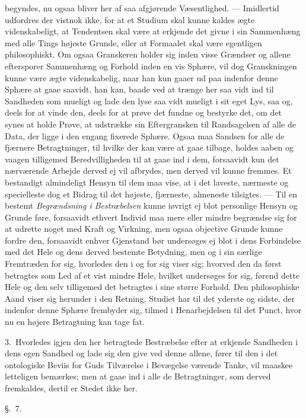 \documentclass[12pt,a4paper]{book}
\newcommand{\apage}[1]{\marginnote{\footnotesize\textit{[#1]}}}
\begin{document}
begyndes, nu ogsaa bliver her af saa afgjørende Væsentlighed. --- Imidlertid
udfordres der vistnok ikke, for at et Studium skal kunne kaldes ægte
videnskabeligt, at Tendentsen skal være at erkjende det givne i sin Sammenhæng
med alle Tings højeste Grunde, eller at Formaalet skal være egentligen
philosophiskt. Om ogsaa Granskeren holder sig inden visse Grændser og allene
eftersporer Sammenhæng og Forhold inden en vis Sphære, vil dog Granskningen
kunne være ægte videnskabelig, naar han kun gaaer ud paa indenfor denne Sphære
at gaae saavidt, han kan, baade ved at trænge \apage{54}  her saa vidt ind til Sandheden som
mueligt og lade den lyse saa vidt mueligt i sit eget Lys, saa og, deels for at
vinde den, deels for at prøve det fundne og bestyrke det, om det synes at holde
Prøve, at udstrække sin Eftergransken til Randsagelsen af alle de Data, der ligge
i den engang fixerede Sphære. Ogsaa maa Sandsen for alle de fjærnere
Betragtninger, til hvilke der kan være at gaae tilbage, holdes aaben og vaagen
tilligemed Beredvilligheden til at gaae ind i dem, forsaavidt kun det nærværende
Arbejde derved ej vil afbrydes, men derved vil kunne fremmes. Et bestandigt
almindeligt Hensyn til dem maa vise, at i det laveste, nærmeste og specielleste
dog et Bidrag til det højeste, fjærneste, almeneste tilsigtes. --- Til en bestemt
\emph{Begrændsning i Bestræbelsen} kunne iøvrigt ej blot personlige Hensyn og
Grunde føre, forsaavidt ethvert Individ maa mere eller mindre begrændse sig for
at udrette noget med Kraft og Virkning, men ogsaa objective Grunde kunne fordre
den, forsaavidt enhver Gjenstand bør undersøges ej blot i dens Forbindelse med
det Hele og dens derved bestemte Betydning, men og i sin særlige Fremtræden for
sig, hvorledes den i og for sig viser sig; hvorved den da først betragtes som Led
af et vist mindre Hele, hvilket undersøges for sig, førend dette Hele og den selv
tilligemed det betragtes i sine større Forhold. Den  \apage{55} philosophiske Aand viser sig
herunder i den Retning, Studiet har til det yderste og sidste, der indenfor denne
Sphære frembyder sig, tilmed i Henarbejdelsen til det Punct, hvor nu en højere
Betragtning kan tage fat.

3.~Hvorledes igjen den her betragtede Bestræbelse efter at erkjende Sandheden i
dens egen Sandhed og lade sig den give ved denne allene, fører til den i det
ontologiske Beviis for Guds Tilværelse i Bevægelse værende Tanke, vil maaskee
letteligen bemærkes; men at gaae ind i alle de Betragtninger, som derved
fremkaldes, dertil er Stedet ikke her.

\begin{center}\large\S.~7.\end{center}
\end{document}
